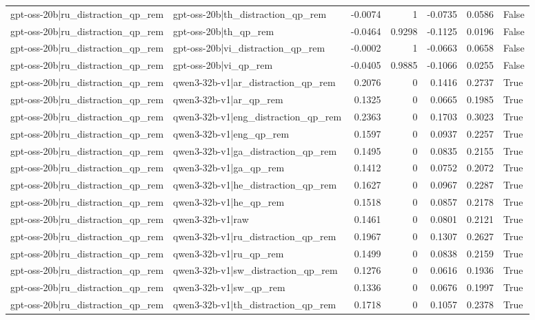\begin{table}
\begin{tabular}{l l r r r r l}
gpt-oss-20b|ru_distraction_qp_rem & gpt-oss-20b|th_distraction_qp_rem & -0.0074 & 1 & -0.0735 & 0.0586 & False \\
gpt-oss-20b|ru_distraction_qp_rem & gpt-oss-20b|th_qp_rem & -0.0464 & 0.9298 & -0.1125 & 0.0196 & False \\
gpt-oss-20b|ru_distraction_qp_rem & gpt-oss-20b|vi_distraction_qp_rem & -0.0002 & 1 & -0.0663 & 0.0658 & False \\
gpt-oss-20b|ru_distraction_qp_rem & gpt-oss-20b|vi_qp_rem & -0.0405 & 0.9885 & -0.1066 & 0.0255 & False \\
gpt-oss-20b|ru_distraction_qp_rem & qwen3-32b-v1|ar_distraction_qp_rem & 0.2076 & 0 & 0.1416 & 0.2737 & True \\
gpt-oss-20b|ru_distraction_qp_rem & qwen3-32b-v1|ar_qp_rem & 0.1325 & 0 & 0.0665 & 0.1985 & True \\
gpt-oss-20b|ru_distraction_qp_rem & qwen3-32b-v1|eng_distraction_qp_rem & 0.2363 & 0 & 0.1703 & 0.3023 & True \\
gpt-oss-20b|ru_distraction_qp_rem & qwen3-32b-v1|eng_qp_rem & 0.1597 & 0 & 0.0937 & 0.2257 & True \\
gpt-oss-20b|ru_distraction_qp_rem & qwen3-32b-v1|ga_distraction_qp_rem & 0.1495 & 0 & 0.0835 & 0.2155 & True \\
gpt-oss-20b|ru_distraction_qp_rem & qwen3-32b-v1|ga_qp_rem & 0.1412 & 0 & 0.0752 & 0.2072 & True \\
gpt-oss-20b|ru_distraction_qp_rem & qwen3-32b-v1|he_distraction_qp_rem & 0.1627 & 0 & 0.0967 & 0.2287 & True \\
gpt-oss-20b|ru_distraction_qp_rem & qwen3-32b-v1|he_qp_rem & 0.1518 & 0 & 0.0857 & 0.2178 & True \\
gpt-oss-20b|ru_distraction_qp_rem & qwen3-32b-v1|raw & 0.1461 & 0 & 0.0801 & 0.2121 & True \\
gpt-oss-20b|ru_distraction_qp_rem & qwen3-32b-v1|ru_distraction_qp_rem & 0.1967 & 0 & 0.1307 & 0.2627 & True \\
gpt-oss-20b|ru_distraction_qp_rem & qwen3-32b-v1|ru_qp_rem & 0.1499 & 0 & 0.0838 & 0.2159 & True \\
gpt-oss-20b|ru_distraction_qp_rem & qwen3-32b-v1|sw_distraction_qp_rem & 0.1276 & 0 & 0.0616 & 0.1936 & True \\
gpt-oss-20b|ru_distraction_qp_rem & qwen3-32b-v1|sw_qp_rem & 0.1336 & 0 & 0.0676 & 0.1997 & True \\
gpt-oss-20b|ru_distraction_qp_rem & qwen3-32b-v1|th_distraction_qp_rem & 0.1718 & 0 & 0.1057 & 0.2378 & True \\

\end{tabular}
\end{table}
